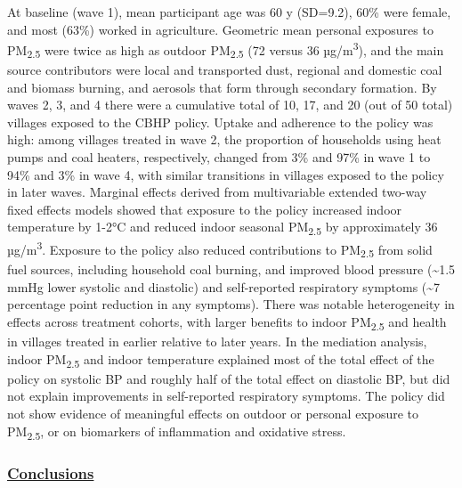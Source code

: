 \documentclass[
  letterpaper,
  DIV=11,
  numbers=noendperiod]{scrartcl}
\providecommand{\DIFadd}[1]{{\protect\color{blue}\underline{#1}}} %
\providecommand{\DIFaddbegin}{} %
\providecommand{\DIFaddend}{} %
\providecommand{\DIFdelbegin}{} %
\providecommand{\DIFdelend}{} %
\newcommand{\DIFscaledelfig}{0.5}
\newlength{\DIFdelgraphicswidth} %
\newlength{\DIFdelgraphicsheight} %
\newcommand{\DIFaddincludegraphics}[2][]{{\color{blue}\fbox{\DIFOincludegraphics[#1]{#2}}}} %
\newcommand{\DIFdelincludegraphics}[2][]{%
\sbox{\DIFdelgraphicsbox}{\DIFOincludegraphics[#1]{#2}}%
\settoboxwidth{\DIFdelgraphicswidth}{\DIFdelgraphicsbox} %
\settoboxtotalheight{\DIFdelgraphicsheight}{\DIFdelgraphicsbox} %
\scalebox{\DIFscaledelfig}{%
\parbox[b]{\DIFdelgraphicswidth}{\usebox{\DIFdelgraphicsbox}\\[-\baselineskip] \rule{\DIFdelgraphicswidth}{0em}}\llap{\resizebox{\DIFdelgraphicswidth}{\DIFdelgraphicsheight}{%
\setlength{\unitlength}{\DIFdelgraphicswidth}%
\begin{picture}(1,1)%
\thicklines\linethickness{2pt} %
{\color[rgb]{1,0,0}\put(0,0){\framebox(1,1){}}}%
{\color[rgb]{1,0,0}\put(0,0){\line( 1,1){1}}}%
{\color[rgb]{1,0,0}\put(0,1){\line(1,-1){1}}}%
\end{picture}%
}\hspace*{3pt}}} %
} %
\DeclareRobustCommand{\DIFaddbegin}{\DIFOaddbegin \let\includegraphics\DIFaddincludegraphics} %
\DeclareRobustCommand{\DIFaddend}{\DIFOaddend \let\includegraphics\DIFOincludegraphics} %
\DeclareRobustCommand{\DIFdelbegin}{\DIFOdelbegin \let\includegraphics\DIFdelincludegraphics} %
\DeclareRobustCommand{\DIFdelend}{\DIFOaddend \let\includegraphics\DIFOincludegraphics} %
\begin{document}
At baseline (wave 1), mean participant age was 60 y (SD=9.2), 60\% were
female, and most (63\%) worked in agriculture. Geometric mean personal
exposures to PM\textsubscript{2.5} were twice as high as outdoor
PM\textsubscript{2.5} (72 versus 36 µg/m\textsuperscript{3}), and the
main source contributors were local and transported dust, regional and
domestic coal and biomass burning, and aerosols that form through
secondary formation. By waves 2, 3, and 4 there were a cumulative total
of 10, 17, and 20 (out of 50 total) villages exposed to the CBHP policy.
Uptake and adherence to the policy was high: among villages treated in
wave 2, the proportion of households using heat pumps and coal heaters,
respectively, changed from 3\% and 97\% in wave 1 to 94\% and 3\% in
wave 4, with similar transitions in villages exposed to the policy in
later waves. Marginal effects derived from multivariable extended
two-way fixed effects models showed that exposure to the policy
increased indoor temperature by 1-2°C and reduced indoor seasonal
PM\textsubscript{2.5} by approximately 36 µg/m\textsuperscript{3}.
Exposure to the policy also reduced contributions to
PM\textsubscript{2.5} from solid fuel sources, including household coal
burning, and improved blood pressure (\textasciitilde1.5 mmHg lower
systolic and diastolic) and self-reported respiratory symptoms
(\textasciitilde7 percentage point reduction in any symptoms). There was
notable heterogeneity in effects across treatment cohorts, with larger
benefits to indoor PM\textsubscript{2.5} and health in villages treated
in earlier relative to later years. In the mediation analysis, indoor
PM\textsubscript{2.5} and indoor temperature explained most of the total
effect of the policy on systolic BP and roughly half of the total effect
on diastolic BP, but did not explain improvements in self-reported
respiratory symptoms. The policy did not show evidence of meaningful
effects on outdoor or personal exposure to PM\textsubscript{2.5}, or on
biomarkers of inflammation and oxidative stress.

\DIFdelbegin %
\DIFdelend \DIFaddbegin \subsubsection*{\DIFadd{Conclusions}}\label{conclusions}
\DIFaddend 
\end{document}

